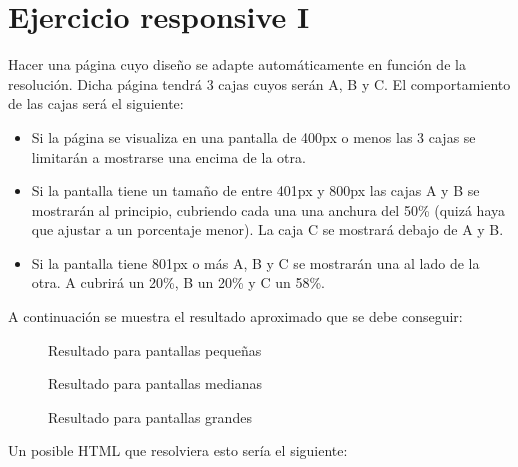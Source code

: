 \documentclass[letterpaper,10pt,spanish]{sphinxmanual}
\begin{document}
\section{Ejercicio responsive I}
\label{\detokenize{tema3:ejercicio-responsive-i}}
Hacer una página cuyo diseño se adapte automáticamente en función de la resolución. Dicha página tendrá 3 cajas cuyos  serán A, B y C. El comportamiento de las cajas será el siguiente:
\begin{itemize}
\item {} 
Si la página se visualiza en una pantalla de 400px o menos las 3 cajas se limitarán a mostrarse una encima de la otra.

\item {} 
Si la pantalla tiene un tamaño de entre 401px y 800px las cajas A y B se mostrarán al principio, cubriendo cada una una anchura del 50\% (quizá haya que ajustar a un porcentaje menor). La caja C se mostrará debajo de A y B.

\item {} 
Si la pantalla tiene 801px o más A, B y C se mostrarán una al lado de la otra. A cubrirá un 20\%, B un 20\% y C un 58\%.

\end{itemize}

A continuación se muestra el resultado aproximado que se debe conseguir:

\begin{figure}[htbp]
\centering
\capstart

\noindent{}
\caption{Resultado para pantallas pequeñas}\label{\detokenize{tema3:id22}}\end{figure}

\begin{figure}[htbp]
\centering
\capstart

\noindent{}
\caption{Resultado para pantallas medianas}\label{\detokenize{tema3:id23}}\end{figure}

\begin{figure}[htbp]
\centering
\capstart

\noindent{}
\caption{Resultado para pantallas grandes}\label{\detokenize{tema3:id24}}\end{figure}

Un posible HTML que resolviera esto sería el siguiente:
\end{document}
